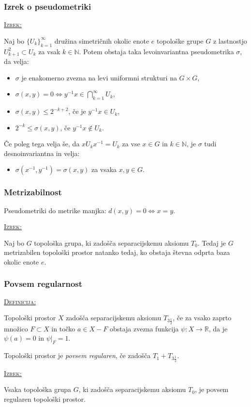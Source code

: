\documentclass[a4paper, 12pt]{beamer}
\newenvironment{matematika}[1]{
\textcolor{bostonuniversityred}{\underline{\textsc{#1:}}}
}{
}
\begin{document}
\begin{frame}
\frametitle{Izrek o pseudometriki}
\begin{matematika}{Izrek}
	Naj bo $\{ U_k \}_{k=1}^{\infty}$ družina simetričnih okolic enote $e$ topološke grupe $G$ z lastnostjo $U_{k+1}^2 \subset U_k$ za vsak $k\in\mathbb{N}$. Potem obstaja taka levoinvariantna pseudometrika $\sigma$, da velja:
	\begin{itemize}[label=]
		\item $\sigma$ je enakomerno zvezna na levi uniformni strukturi na $G \times G$,
		\item $\sigma (x, y) = 0 \iff y^{-1}x \in \bigcap_{k=1}^{\infty}U_k$,
		\item $\sigma (x, y) \leq 2^{-k+2}$, če je $y^{-1}x \in U_k$,
		\item $2^{-k} \leq \sigma (x, y)$, če $y^{-1}x \notin U_k$.
	\end{itemize}
	Če poleg tega velja še, da $x U_k x^{-1} = U_k$ za vse $x \in G$ in $k\in\mathbb{N}$, je $\sigma$ tudi desnoinvariantna in velja:
	\begin{itemize}[label=]
		\item $\sigma (x^{-1}, y^{-1}) = \sigma (x, y)$ za vsaka $x, y \in G$.
	\end{itemize}
\end{matematika}
\end{frame}

\begin{frame}
\frametitle{Metrizabilnost}
Pseudometriki do metrike manjka: $d(x, y) = 0 \iff x = y$. \newline

\begin{matematika}{Izrek}
Naj bo $G$ topološka grupa, ki zadošča separacijskemu aksiomu $T_0$. Tedaj je $G$ metrizabilen topološki prostor natanko tedaj, ko obstaja števna odprta baza okolic enote $e$.
\end{matematika}
\end{frame}

\begin{frame}
\frametitle{Povsem regularnost}
\begin{matematika}{Definicija}
Topološki prostor $X$ zadošča separacijskemu aksiomu $T_{3\frac{1}{2}}$, če za vsako zaprto množico $F \subset X$ in točko $a \in X-F$ obstaja zvezna funkcija $\psi: X \to \mathbb{R}$, da je $\psi(a) = 0$ in $\psi|_F = 1$.

Topološki prostor je \emph{povsem regularen}, če zadošča $T_1 + T_{3\frac{1}{2}}$.
\end{matematika}\newline

\begin{matematika}{Izrek}
Vsaka topološka grupa $G$, ki zadošča separacijskemu aksiomu $T_0$, je povsem regularen topološki prostor.
\end{matematika}
\end{frame}
\end{document}
